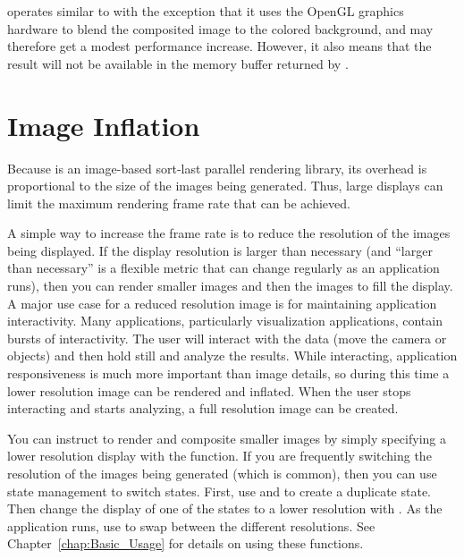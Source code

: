  operates similar to
 with the exception that it uses
the OpenGL graphics hardware to blend the composited image to the colored
background, and may therefore get a modest performance increase.  However,
it also means that the result will not be available in the memory buffer
returned by .




\section{Image Inflation}
\label{sec:Customizing_Compositing:Image_Inflation}

Because \IceT is an image-based sort-last parallel
rendering library, its overhead is proportional to the size of the images
being generated.  Thus, large displays can limit the maximum rendering
frame rate that can be achieved.

A simple way to increase the frame rate is to reduce the resolution of the
images being displayed.  If the display resolution is larger than necessary
(and ``larger than necessary'' is a flexible metric that can change
regularly as an application runs), then you can render smaller images and
then  the images to fill the display.  A major use case
for a reduced resolution image is for maintaining application
interactivity.  Many applications, particularly visualization applications,
contain bursts of interactivity.  The user will interact with the data
(move the camera or objects) and then hold still and analyze the results.
While interacting, application responsiveness is much more important than
image details, so during this time a lower resolution image can be rendered
and inflated.  When the user stops interacting and starts analyzing, a full
resolution image can be created.

You can instruct \IceT to render and composite smaller images by simply
specifying a lower resolution display with the 
function.  If you are frequently switching the resolution of the images
being generated (which is common), then you can use \IceT state management
to switch states.  First, use  and
 to create a duplicate state.  Then change the display
of one of the states to a lower resolution with .  As
the application runs, use  to swap between the
different resolutions.  See Chapter~\ref{chap:Basic_Usage} for details on
using these functions.

